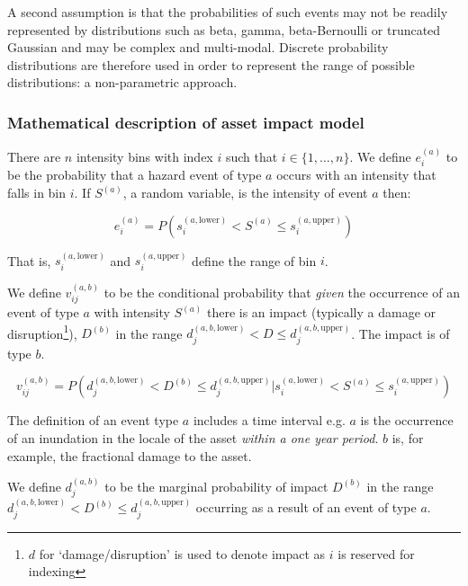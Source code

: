 \documentclass[a4paper,11pt]{extarticle} %
\begin{document}
A second assumption is that the probabilities of such events may not be readily represented by distributions such as beta, gamma, beta-Bernoulli or truncated Gaussian and may be complex and multi-modal. Discrete probability distributions are therefore used in order to represent the range of possible distributions: a non-parametric approach.

\subsubsection{Mathematical description of asset impact model}
\label{Sec:MathematicalDescriptionOfAssetImpactModel}

There are $n$ intensity bins with index $i$ such that $i \in \{1, \dots, n \}$. We define $e^{(a)}_i$ to be the probability that a hazard event of type $a$ occurs with an intensity that falls in bin $i$. If $S^{(a)}$, a random variable, is the intensity of event $a$ then:

\begin{equation}
    \label{Eq:event}
    e^{(a)}_i = P \left( s^{(a, \text{lower})}_i < S^{(a)} \le s^{(a, \text{upper})}_i \right)
\end{equation}

That is, $s^{(a, \text{lower})}_i$ and $s^{(a, \text{upper})}_i$ define the range of bin $i$.

We define $v^{(a, b)}_{ij}$ to be the conditional probability that \emph{given} the occurrence of an event of type $a$ with intensity $S^{(a)}$ there is an impact (typically a damage or disruption\footnote{$d$ for `damage/disruption' is used to denote impact as $i$ is reserved for indexing}), $D^{(b)}$ in the range $d^{(a,b,\text{lower})}_j < D \le d^{(a,b,\text{upper})}_j$. The impact is of type $b$.


\begin{equation}
    \label{Eq:vulnerability}
    v^{(a, b)}_{ij} = P \left( d^{(a,b,\text{lower})}_j < D^{(b)} \le d^{(a,b,\text{upper})}_j | s^{(a, \text{lower})}_i < S^{(a)} \le s^{(a, \text{upper})}_i \right)
\end{equation}

The definition of an event type $a$ includes a time interval e.g. $a$ is the occurrence of an inundation in the locale of the asset {\it within a one year period}. $b$ is, for example, the fractional damage to the asset.

We define $d^{(a,b)}_j$ to be the marginal probability of impact $D^{(b)}$ in the range $d^{(a,b, \text{lower})}_j < D^{(b)} \le d^{(a,b,\text{upper})}_j$ occurring as a result of an event of type $a$.
\end{document}
